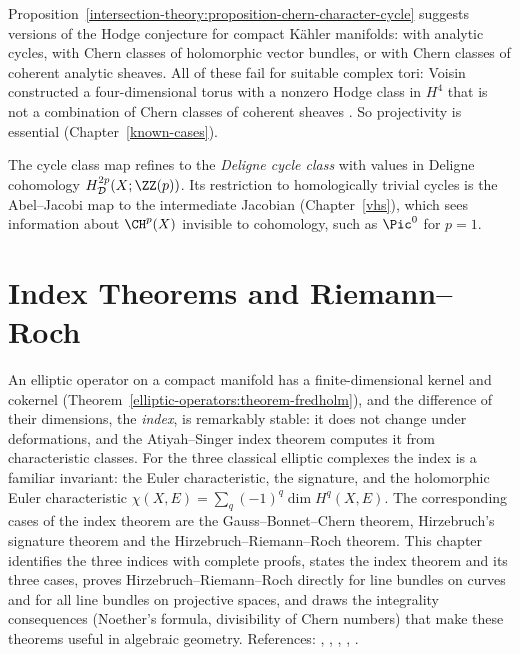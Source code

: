 \begin{remark}\label{intersection-theory:remark-kahler-version}
Proposition~\ref{intersection-theory:proposition-chern-character-cycle} suggests versions of the Hodge conjecture for compact K\"ahler manifolds: with analytic cycles, with Chern classes of
holomorphic vector bundles, or with Chern classes of coherent analytic sheaves. All of these fail for suitable complex tori: Voisin constructed a
four-dimensional torus with a nonzero Hodge class in $H^4$ that is not a combination of Chern classes of coherent sheaves \cite{voisin-2002}. So projectivity is essential
(Chapter~\ref{known-cases}).
\end{remark}

\begin{remark}\label{intersection-theory:remark-deligne-cohomology}
The cycle class map refines to the \emph{Deligne cycle class} with values in Deligne cohomology $H^{2p}_{\mathcal{D}}(X; \ZZ(p))$. Its restriction to homologically trivial cycles is the
Abel--Jacobi map to the intermediate Jacobian (Chapter~\ref{vhs}), which sees information about $\CH^p(X)$ invisible to cohomology, such as $\Pic^0$ for $p = 1$.
\end{remark}

\section{Index Theorems and Riemann--Roch}\label{intersection-theory:section-index-theorems}
An elliptic operator on a compact manifold has a finite-dimensional kernel and cokernel (Theorem~\ref{elliptic-operators:theorem-fredholm}), and the difference of their dimensions, the \emph{index}, is remarkably stable: it does
not change under deformations, and the Atiyah--Singer index theorem computes it from characteristic classes. For the three classical elliptic complexes the index is a familiar invariant: the Euler characteristic, the
signature, and the holomorphic Euler characteristic $\chi(X, E) = \sum_q(-1)^q\dim H^q(X, E)$. The corresponding cases of the index theorem are the Gauss--Bonnet--Chern theorem, Hirzebruch's signature theorem and the
Hirzebruch--Riemann--Roch theorem. This chapter identifies the three indices with complete proofs, states the index theorem and its three cases, proves Hirzebruch--Riemann--Roch directly for line bundles on curves and for
all line bundles on projective spaces, and draws the integrality consequences (Noether's formula, divisibility of Chern numbers) that make these theorems useful in algebraic geometry. References: \cite{hirzebruch-topological},
\cite{atiyah-singer-1968-1}, \cite{atiyah-singer-1968-3}, \cite{lawson-michelsohn}, \cite{griffiths-harris}.

